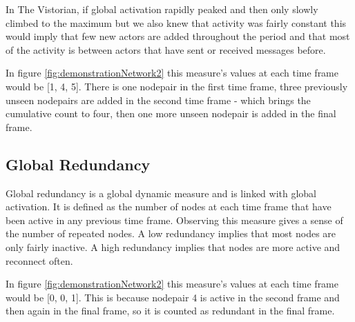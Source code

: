 In The Vistorian, if global activation rapidly peaked and then only slowly climbed to the maximum but we also knew that activity was fairly constant this would imply that few new actors are added throughout the period and that most of the activity is between actors that have sent or received messages before.

In figure \ref{fig:demonstrationNetwork2} this measure's values at each time frame would be [1, 4, 5]. There is one nodepair in the first time frame, three previously unseen nodepairs are added in the second time frame - which brings the cumulative count to four, then one more unseen nodepair is added in the final frame.




\subsection{Global Redundancy}
Global redundancy is a global dynamic measure and is linked with global activation. It is defined as the number of nodes at each time frame that have been active in any previous time frame. Observing this measure gives a sense of the number of repeated nodes. A low redundancy implies that most nodes are only fairly inactive. A high redundancy implies that nodes are more active and reconnect often.

In figure \ref{fig:demonstrationNetwork2} this measure's values at each time frame would be [0, 0, 1]. This is because nodepair 4 is active in the second frame and then again in the final frame, so it is counted as redundant in the final frame.





